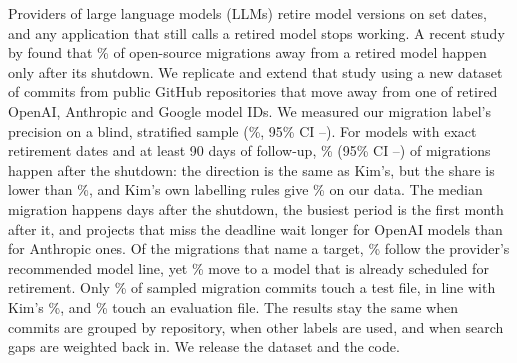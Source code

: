 Providers of large language models (LLMs) retire model versions on set dates, and any application that still calls a retired model stops working. A recent study by \citet{kim2026retires} found that \KimAfterShutdown\% of open-source migrations away from a retired model happen only after its shutdown. We replicate and extend that study using a new dataset of \MigrationsAway{} commits from public GitHub repositories that move away from one of \ModelIds{} retired OpenAI, Anthropic and Google model IDs. We measured our migration label's precision on a blind, stratified sample (\Precision\%, 95\% CI \PrecisionLow--\PrecisionHigh). For models with exact retirement dates and at least 90 days of follow-up, \AfterLate\% (95\% CI \AfterLateLow--\AfterLateHigh) of migrations happen after the shutdown: the direction is the same as Kim's, but the share is lower than \KimAfterShutdown\%, and Kim's own labelling rules give \AfterKimLabel\% on our data. The median migration happens \ExactDays{} days after the shutdown, the busiest period is the first month after it, and projects that miss the deadline wait longer for OpenAI models than for Anthropic ones. Of the migrations that name a target, \FollowsLine\% follow the provider's recommended model line, yet \TargetOnList\% move to a model that is already scheduled for retirement. Only \TouchTest\% of sampled migration commits touch a test file, in line with Kim's \KimTouchTest\%, and \TouchEval\% touch an evaluation file. The results stay the same when commits are grouped by repository, when other labels are used, and when search gaps are weighted back in. We release the dataset and the code.
